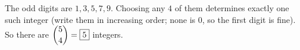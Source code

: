 The odd digits are $1,3,5,7,9$. Choosing any $4$ of them determines exactly one such integer (write them in increasing order; none is $0$, so the first digit is fine). So there are $\dbinom54=\boxed{5}$ integers.
